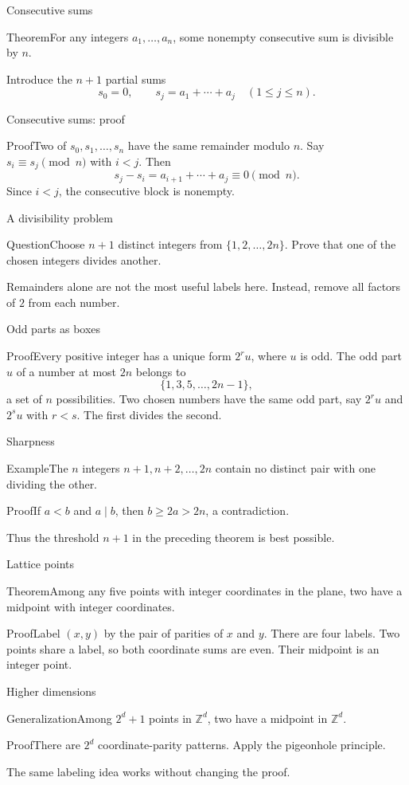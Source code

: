 \documentclass[aspectratio=169,11pt]{beamer}
\newcommand{\Thm}[2]{\begin{block}{#1}#2\end{block}}
\renewcommand{\Proof}[1]{\begin{block}{Proof}\normalsize #1\end{block}}
\newcommand{\Question}[1]{\begin{block}{Question}#1\end{block}}
\renewcommand{\Example}[1]{\begin{block}{Example}#1\end{block}}
\newcommand{\gap}{\par\medskip}
\begin{document}
\begin{frame}{Consecutive sums}
\large
\Thm{Theorem}{For any integers $a_1,\ldots,a_n$, some nonempty consecutive sum is divisible by $n$.}
\gap Introduce the $n+1$ partial sums
\[s_0=0,\qquad s_j=a_1+\cdots+a_j\quad(1\leq j\leq n).\]
\end{frame}
\begin{frame}{Consecutive sums: proof}
\large
\Proof{Two of $s_0,s_1,\ldots,s_n$ have the same remainder modulo $n$. Say $s_i\equiv s_j\pmod n$ with $i<j$. Then
\[s_j-s_i=a_{i+1}+\cdots+a_j\equiv0\pmod n.\]
Since $i<j$, the consecutive block is nonempty.}
\end{frame}
\begin{frame}{A divisibility problem}
\large
\Question{Choose $n+1$ distinct integers from $\{1,2,\ldots,2n\}$. Prove that one of the chosen integers divides another.}
\gap Remainders alone are not the most useful labels here. Instead, remove all factors of $2$ from each number.
\end{frame}
\begin{frame}{Odd parts as boxes}
\large
\Proof{Every positive integer has a unique form $2^r u$, where $u$ is odd. The odd part $u$ of a number at most $2n$ belongs to
\[\{1,3,5,\ldots,2n-1\},\]
a set of $n$ possibilities. Two chosen numbers have the same odd part, say $2^r u$ and $2^s u$ with $r<s$. The first divides the second.}
\end{frame}
\begin{frame}{Sharpness}
\large
\Example{The $n$ integers $n+1,n+2,\ldots,2n$ contain no distinct pair with one dividing the other.}
\Proof{If $a<b$ and $a\mid b$, then $b\geq2a>2n$, a contradiction.}
\gap Thus the threshold $n+1$ in the preceding theorem is best possible.
\end{frame}
\begin{frame}{Lattice points}
\large
\Thm{Theorem}{Among any five points with integer coordinates in the plane, two have a midpoint with integer coordinates.}
\Proof{Label $(x,y)$ by the pair of parities of $x$ and $y$. There are four labels. Two points share a label, so both coordinate sums are even. Their midpoint is an integer point.}
\end{frame}
\begin{frame}{Higher dimensions}
\large
\Thm{Generalization}{Among $2^d+1$ points in $\mathbb Z^d$, two have a midpoint in $\mathbb Z^d$.}
\Proof{There are $2^d$ coordinate-parity patterns. Apply the pigeonhole principle.}
\gap The same labeling idea works without changing the proof.
\end{frame}
\end{document}
